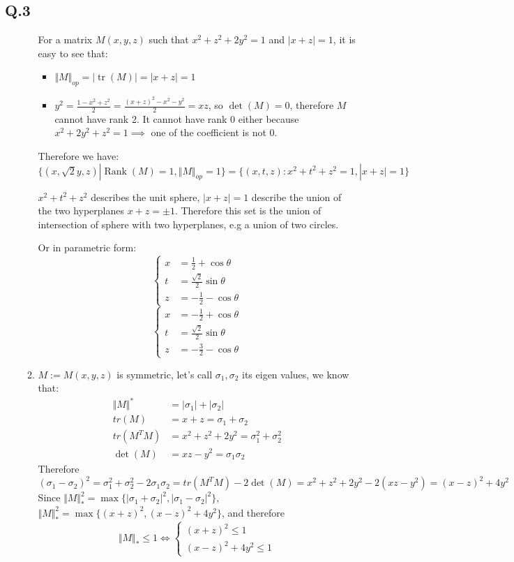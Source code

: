 \documentclass[12pt]{article}
\newcommand{\Q}[1]{\subsection*{Q.#1}}
\newenvironment{question}[1]
{\Q{#1}}{}
\DeclareMathOperator{\tr}{tr}
\DeclareMathOperator{\rank}{Rank}
\begin{document}
\begin{question}{3}
\begin{enumerate}
\begin{enumerate}
      For a matrix $M(x, y, z)$ such that $x^2 + z^2 + 2y^2 = 1$ and $|x+z|=1$, it is easy to see that:
      \begin{itemize}
      \item $\Vert M\Vert _{op} = |\tr(M)| = |x+z| = 1$
      \item $y^2 = \frac{1 - x^2 + z^2}2 = \frac{(x+z)^2 - x^2 - y^2}2 = xz$, so $\det(M) = 0$, therefore $M$ cannot have rank 2. It cannot have rank 0 either because $x^2 + 2y^2 + z^2 = 1 \implies$ one of the coefficient is not 0.
      \end{itemize}
      Therefore we have:
      $\{ (x, \sqrt2 y, z) | \rank(M) = 1, \Vert M\Vert _{op} = 1 \} = \{ (x, t, z): x^2 + t^2 + z^2 = 1, |x+z|=1  \} $
      
      $x^2 + t^2 + z^2$ describes the unit sphere, $|x+z| = 1$ describe the union of the two hyperplanes $x + z = \pm 1$.
      Therefore this set is the union of  intersection of sphere with two hyperplanes, e.g a union of two circles.

      Or in parametric form:
      \[
        \left\{
          \begin{array}{cc}
            x &=  \frac12 + \cos \theta \\
            t &= \frac{\sqrt2}2 \sin \theta \\
            z &= - \frac12 - \cos \theta
          \end{array}
        \right.
      \]
      \[
        \left\{
          \begin{array}{cc}
            x &=  -\frac12 + \cos \theta \\
            t &= \frac{\sqrt2}2 \sin \theta \\
            z &=  -\frac32 - \cos \theta
          \end{array}
        \right.
      \]     

    \item $M := M(x, y, z)$ is symmetric, let's call $\sigma_1, \sigma_2$ its eigen values, we know that:
      \begin{align*}
        \Vert M\Vert ^* &= |\sigma_1| + |\sigma_2| \\
        tr(M) &= x + z = \sigma_1 + \sigma_2 \\
        tr(M^TM) &= x^2 + z^2 + 2y^2 = \sigma_1^2 + \sigma_2^2\\
        \det(M) &= xz - y^2 = \sigma_1 \sigma_2
      \end{align*}
      Therefore $(\sigma_1 - \sigma_2)^2 = \sigma_1^2 + \sigma_2^2 - 2 \sigma_1\sigma_2 = tr(M^TM) - 2\det(M) = x^2 + z^2 + 2y^2 - 2(xz - y^2) = (x - z)^2 + 4y^2$
      Since $\Vert M\Vert _*^2 = \max \{ |\sigma_1 + \sigma_2|^2, |\sigma_1 - \sigma_2|^2\}$, $\Vert M\Vert _*^2 = \max \{ (x+z)^2, (x-z)^2+4y^2 \}$,
      and therefore \[ \Vert M\Vert _* \le 1 \iff \left\{ \begin{array}{c} (x+z)^2 \le 1\\ (x-z)^2+4y^2 \le 1 \end{array} \right.  \]



\end{enumerate}
\end{enumerate}
\end{question}
\end{document}
